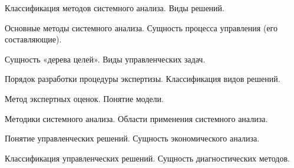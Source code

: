 \documentclass[
	14pt,
	a4paper,
	]
	{scrartcl}
\begin{document}
\shapk
{}
\setcounter{zad}{0}

\vfill
\z Классификация методов системного анализа.
 \vfill
\z Виды решений.
 \vfill

\vfill

\newpage


\shapk
{}
\setcounter{zad}{0}

\vfill
\z Основные методы системного анализа.
 \vfill
\z Сущность процесса управления (его составляющие).
 \vfill

\vfill

\newpage


\shapk
{}
\setcounter{zad}{0}

\vfill
\z Сущность «дерева целей».
 \vfill
\z Виды управленческих задач.
 \vfill

\vfill

\newpage


\shapk
{}
\setcounter{zad}{0}

\vfill
\z Порядок разработки процедуры экспертизы.
 \vfill
\z Классификация видов решений.
 \vfill

\vfill

\newpage


\shapk
{}
\setcounter{zad}{0}

\vfill
\z Метод экспертных оценок.
 \vfill
\z Понятие модели.
 \vfill

\vfill

\newpage


\shapk
{}
\setcounter{zad}{0}

\vfill
\z Методики системного анализа.
 \vfill
\z Области применения системного анализа.
 \vfill

\vfill

\newpage


\shapk
{}
\setcounter{zad}{0}

\vfill
\z Понятие управленческих решений.
 \vfill
\z Сущность экономического анализа.
 \vfill

\vfill

\newpage


\shapk
{}
\setcounter{zad}{0}

\vfill
\z Классификация управленческих решений.
 \vfill
\z Сущность диагностических методов.
 \vfill

\vfill

\newpage
\end{document}
